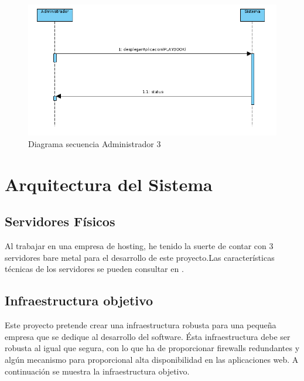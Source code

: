 		\begin{figure}[!hbt]
			\centering
			\includegraphics[scale=0.4]{imagenes/Analisis/diagrama_secuencia_administrador_2.png}
			\caption[Diagrama secuencia Administrador 3]{Diagrama secuencia Administrador 3 \cite{diagramasecuencia:online}}
			\label{Diagrama secuencia_administrador_3}
		\end{figure}
		
	
\section{Arquitectura del Sistema}
	\subsection{Servidores Físicos}
		\begin{paragraph}
			Al trabajar en una empresa de hosting, he tenido la suerte de contar con 3 servidores bare metal para el desarrollo de este proyecto.Las características técnicas de los servidores se pueden consultar en .
		\end{paragraph}
	\subsection{Infraestructura objetivo}
		\label{InfraestructuraObjetivo}
		\begin{paragraph}
			Este proyecto pretende crear una infraestructura robusta para una pequeña empresa que se dedique al desarrollo del software. Ésta infraestructura debe ser robusta al igual que segura, con lo que ha de proporcionar firewalls redundantes y algún mecanismo para proporcional alta disponibilidad en las aplicaciones web.  A continuación se muestra la infraestructura objetivo.
		\end{paragraph}
	
